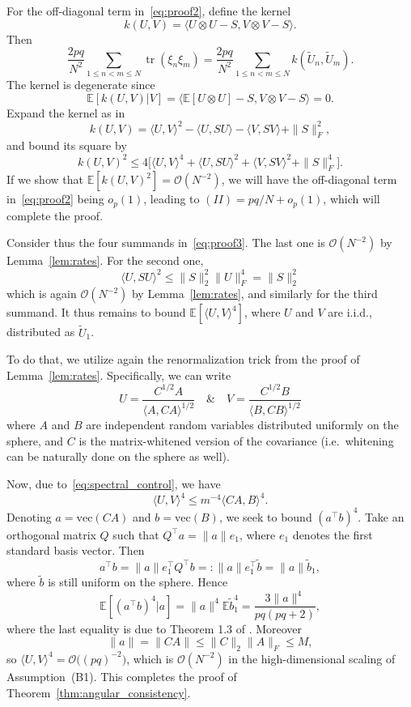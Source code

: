 \documentclass[12pt]{article}
\newcommand{\E}{\mathbb{E}}
\renewcommand{\vec}{\mathrm{vec}}
\newcommand{\tr}{\operatorname{tr}}
\begin{document}
For the off-diagonal term in~\eqref{eq:proof2}, define the kernel
\[
k(U,V) = \langle U \otimes U - S, V \otimes V - S \rangle.
\]
Then
\[
\frac{2pq}{N^2}\sum_{1\le n<m\le N}\tr(\xi_n \xi_m)
=
\frac{2pq}{N^2}\sum_{1\le n<m\le N} k(\widetilde U_n,\widetilde U_m).
\]
The kernel is degenerate since
\[
\E[k(U,V)|V] = \langle \E[U \otimes U] - S, V \otimes V - S \rangle = 0.
\]
Expand the kernel as in
\[
k(U,V) = \langle U,V\rangle^2 - \langle U, S U \rangle - \langle V, S V \rangle + \|S\|_F^2,
\]
and bound its square by
\begin{equation}\label{eq:proof3}
k(U,V)^2 \leq 4 \big[ \langle U,V\rangle^4 + \langle U, S U \rangle^2 + \langle V, S V \rangle^2 + \|S\|_F^4 \big].
\end{equation}
If we show that $\E[k(U,V)^2] = \mathcal{O}(N^{-2})$, we will have the off-diagonal term in~\eqref{eq:proof2} being $o_p(1)$, leading to $(II)=pq/N+o_p(1)$, which will complete the proof.

Consider thus the four summands in~\eqref{eq:proof3}. The last one is $\mathcal{O}(N^{-2})$ by Lemma~\ref{lem:rates}. For the second one,
\[
\langle U, S U \rangle^2 \leq \|S\|_{2}^2 \|U\|_F^4 = \|S\|_{2}^2
\]
which is again $\mathcal{O}(N^{-2})$ by Lemma~\ref{lem:rates}, and similarly for the third summand. It thus remains to bound $\E[\langle U,V\rangle^4]$, where $U$ and $V$ are i.i.d., distributed as $\widetilde{U}_1$.

To do that, we utilize again the renormalization trick from the proof of Lemma~\ref{lem:rates}. Specifically, we can write
\[
U = \frac{C^{1/2} A}{ \langle A, C A \rangle^{1/2}} \quad \& \quad V = \frac{C^{1/2} B}{ \langle B, C B \rangle^{1/2}}
\]
where $A$ and $B$ are independent random variables distributed uniformly on the sphere, and $C$ is the matrix-whitened version of the covariance (i.e.~whitening can be naturally done on the sphere as well).

Now, due to~\eqref{eq:spectral_control}, we have
\[
\langle U , V \rangle^4 \leq m^{-4} \langle CA,B\rangle^4.
\]
Denoting $a=\vec(CA)$ and $b=\vec(B)$, we seek to bound $(a^\top b)^4$. Take an orthogonal matrix $Q$ such that $Q^\top a = \|a\| e_1$, where $e_1$ denotes the first standard basis vector. Then
\[
a^\top b = \|a\|e_1^\top Q^\top b =: \|a\|e_1^\top \widetilde{b} = \|a\|\widetilde{b}_1,
\]
where $\widetilde{b}$ is still uniform on the sphere. Hence
\[
\E[(a^\top b)^4|a] = \|a\|^4\E \widetilde b_1^4 = \frac{3 \|a\|^4}{pq(pq+2)},
\]
where the last equality is due to Theorem 1.3 of \citet{FKN}. Moreover
\[
\|a\| = \| CA \| \leq \|C\|_{2} \|A\|_F \leq M,
\]
so $\langle U , V \rangle^4 = \mathcal O\big((pq)^{-2}\big)$, which is $\mathcal O(N^{-2})$ in the high-dimensional scaling of Assumption~(B1). This completes the proof of Theorem~\ref{thm:angular_consistency}.
\end{document}

